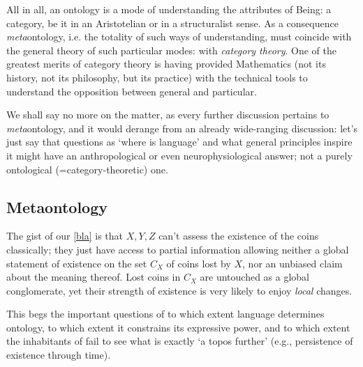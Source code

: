 All in all, an ontology is a mode of understanding the attributes of Being: a category, be it in an Aristotelian or in a structuralist sense. As a consequence \emph{meta}ontology, i.e. the totality of such ways of understanding, must coincide with the general theory of such particular modes: with \emph{category theory}. One of the greatest merits of category theory is having provided Mathematics (not its history, not its philosophy, but its practice) with the technical tools to understand the opposition between general and particular.

We shall say no more on the matter, as every further discussion pertains to \emph{meta}ontology, and it would derange from an already wide-ranging discussion: let's just say that questions as `where is language' and what general principles inspire it might have an anthropological or even neurophysiological answer; not a purely ontological (=category-theoretic) one.

\subsection{Metaontology} \label{metaon}
The gist of our \autoref{bla} is that $X,Y,Z$ can't assess the existence of the coins classically; they just have access to partial information allowing neither a global statement of existence on the set $C_X$ of coins lost by $X$, nor an unbiased claim about the meaning thereof. Lost coins in $C_X$ are untouched as a global conglomerate, yet their strength of existence is very likely to enjoy \emph{local} changes.

This begs the important questions of to which extent language determines ontology, to which extent it constrains its expressive power, and to which extent the inhabitants of \tlon fail to see what is exactly `a topos further' (e.g., persistence of existence through time).

